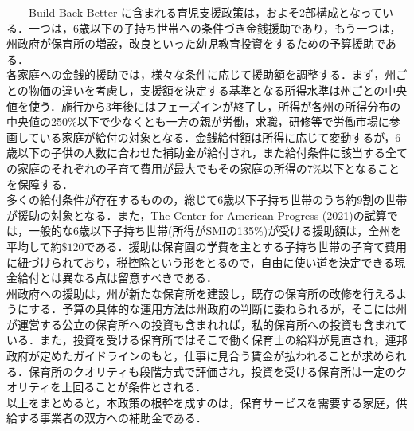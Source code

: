 \documentclass[
]{ltjarticle}
\begin{document}
~~~~Build Back Better
に含まれる育児支援政策は，およそ2部構成となっている．一つは，6歳以下の子持ち世帯への条件づき金銭援助であり，もう一つは，州政府が保育所の増設，改良といった幼児教育投資をするための予算援助である．\\
\hspace*{0.333em}\hspace*{0.333em}\hspace*{0.333em}\hspace*{0.333em}各家庭への金銭的援助では，様々な条件に応じて援助額を調整する．まず，州ごとの物価の違いを考慮し，支援額を決定する基準となる所得水準は州ごとの中央値を使う．施行から3年後にはフェーズインが終了し，所得が各州の所得分布の中央値の250\%以下で少なくとも一方の親が労働，求職，研修等で労働市場に参画している家庭が給付の対象となる．金銭給付額は所得に応じて変動するが，6歳以下の子供の人数に合わせた補助金が給付され，また給付条件に該当する全ての家庭のそれぞれの子育て費用が最大でもその家庭の所得の7\%以下となることを保障する．\\
\hspace*{0.333em}\hspace*{0.333em}\hspace*{0.333em}\hspace*{0.333em}多くの給付条件が存在するものの，総じて6歳以下子持ち世帯のうち約9割の世帯が援助の対象となる．また，The
Center for American Progress
(2021)の試算では，一般的な6歳以下子持ち世帯(所得がSMIの135\%)が受ける援助額は，全州を平均して約\(\$120\)である．援助は保育園の学費を主とする子持ち世帯の子育て費用に紐づけられており，税控除という形をとるので，自由に使い道を決定できる現金給付とは異なる点は留意すべきである．\\
\hspace*{0.333em}\hspace*{0.333em}\hspace*{0.333em}\hspace*{0.333em}州政府への援助は，州が新たな保育所を建設し，既存の保育所の改修を行えるようにする．予算の具体的な運用方法は州政府の判断に委ねられるが，そこには州が運営する公立の保育所への投資も含まれれば，私的保育所への投資も含まれている．また，投資を受ける保育所ではそこで働く保育士の給料が見直され，連邦政府が定めたガイドラインのもと，仕事に見合う賃金が払われることが求められる．保育所のクオリティも段階方式で評価され，投資を受ける保育所は一定のクオリティを上回ることが条件とされる．\\
\hspace*{0.333em}\hspace*{0.333em}\hspace*{0.333em}\hspace*{0.333em}以上をまとめると，本政策の根幹を成すのは，保育サービスを需要する家庭，供給する事業者の双方への補助金である．
\end{document}
